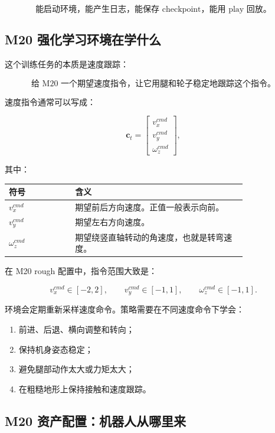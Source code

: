 \documentclass[UTF8,11pt,a4paper]{ctexart}
\newcommand{\bs}[1]{\bm{#1}}
\begin{document}
\[
\boxed{
\text{能启动环境，能产生日志，能保存 checkpoint，能用 play 回放。}
}
\]

\subsection{M20 强化学习环境在学什么}

这个训练任务的本质是速度跟踪：

\[
\boxed{
\text{给 M20 一个期望速度指令，让它用腿和轮子稳定地跟踪这个指令。}
}
\]

速度指令通常可以写成：

\[
\bs c_t =
\begin{bmatrix}
v_x^{cmd} \\
v_y^{cmd} \\
\omega_z^{cmd}
\end{bmatrix},
\]

其中：

\begin{center}
\begin{tabular}{p{0.22\linewidth}p{0.58\linewidth}}
\toprule
符号 & 含义 \\
\midrule
\(v_x^{cmd}\) & 期望前后方向速度。正值一般表示向前。\\
\(v_y^{cmd}\) & 期望左右方向速度。\\
\(\omega_z^{cmd}\) & 期望绕竖直轴转动的角速度，也就是转弯速度。\\
\bottomrule
\end{tabular}
\end{center}

在 M20 rough 配置中，指令范围大致是：

\[
v_x^{cmd}\in[-2,2],\qquad
v_y^{cmd}\in[-1,1],\qquad
\omega_z^{cmd}\in[-1,1].
\]

环境会定期重新采样速度命令。策略需要在不同速度命令下学会：

\begin{enumerate}
  \item 前进、后退、横向调整和转向；
  \item 保持机身姿态稳定；
  \item 避免腿部动作太大或力矩太大；
  \item 在粗糙地形上保持接触和速度跟踪。
\end{enumerate}

\subsection{M20 资产配置：机器人从哪里来}
\end{document}
